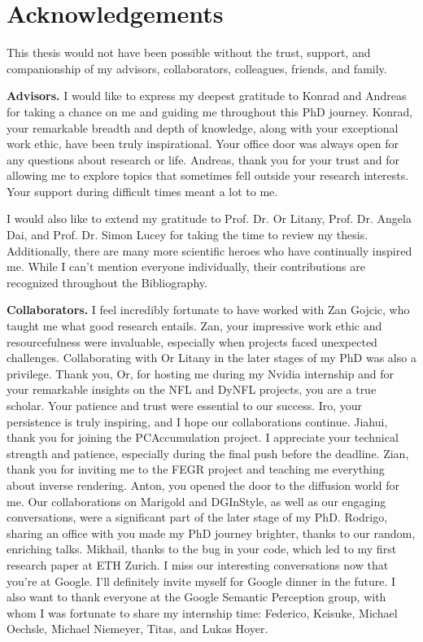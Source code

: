 
\chapter*{Acknowledgements}
\label{chap:acknowledgements}

This thesis would not have been possible without the trust, support, and companionship of my advisors, collaborators, colleagues, friends, and family.

\noindent
\textbf{Advisors.}
I would like to express my deepest gratitude to Konrad and Andreas for taking a chance on me and guiding me throughout this PhD journey. Konrad, your remarkable breadth and depth of knowledge, along with your exceptional work ethic, have been truly inspirational. Your office door was always open for any questions about research or life. Andreas, thank you for your trust and for allowing me to explore topics that sometimes fell outside your research interests. Your support during difficult times meant a lot to me.

I would also like to extend my gratitude to Prof. Dr. Or Litany, Prof. Dr. Angela Dai, and Prof. Dr. Simon Lucey for taking the time to review my thesis. Additionally, there are many more scientific heroes who have continually inspired me. While I can't mention everyone individually, their contributions are recognized throughout the Bibliography.

\noindent
\textbf{Collaborators.}
I feel incredibly fortunate to have worked with Zan Gojcic, who taught me what good research entails. Zan, your impressive work ethic and resourcefulness were invaluable, especially when projects faced unexpected challenges. Collaborating with Or Litany in the later stages of my PhD was also a privilege. Thank you, Or, for hosting me during my Nvidia internship and for your remarkable insights on the NFL and DyNFL projects, you are a true scholar. Your patience and trust were essential to our success. Iro, your persistence is truly inspiring, and I hope our collaborations continue. Jiahui, thank you for joining the PCAccumulation project. I appreciate your technical strength and patience, especially during the final push before the deadline. Zian, thank you for inviting me to the FEGR project and teaching me everything about inverse rendering. Anton, you opened the door to the diffusion world for me. Our collaborations on Marigold and DGInStyle, as well as our engaging conversations, were a significant part of the later stage of my PhD. Rodrigo, sharing an office with you made my PhD journey brighter, thanks to our random, enriching talks. Mikhail, thanks to the bug in your code, which led to my first research paper at ETH Zurich. I miss our interesting conversations now that you're at Google. I'll definitely invite myself for Google dinner in the future. I also want to thank everyone at the Google Semantic Perception group, with whom I was fortunate to share my internship time: Federico, Keisuke, Michael Oechsle, Michael Niemeyer, Titas, and Lukas Hoyer.

